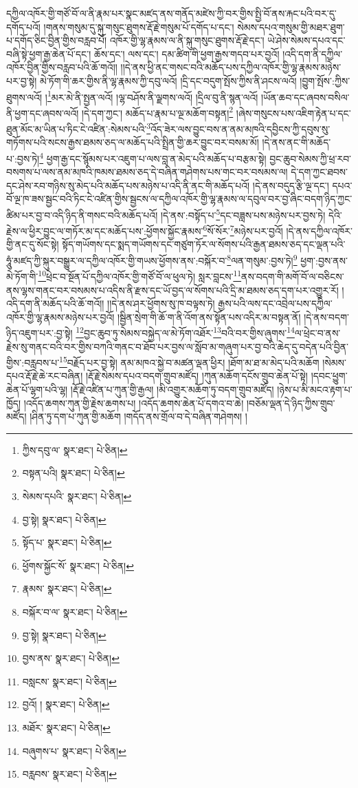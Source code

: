 དཀྱིལ་འཁོར་གྱི་གཙོ་བོ་ལ་ནི་རྣམ་པར་སྣང་མཛད་ནས་གནོད་མཛེས་ཀྱི་བར་གྱིས་སྤྱི་བོ་ནས་རྐང་པའི་བར་དུ་དགོད་པའོ། །གནས་གསུམ་དུ་སྐུ་གསུང་ཐུགས་རྡོ་རྗེ་གསུམ་པོ་དགོད་པ་དང་། སེམས་དཔའ་གསུམ་གྱི་མཐར་ཐུག་པ་དགོད་ཅིང་བྱིན་གྱིས་བརླབ་པོ། འཁོར་གྱི་ལྷ་རྣམས་ལ་ནི་སྐུ་གསུང་ཐུགས་རྡོ་རྗེ་དང་། ཡེ་ཤེས་སེམས་དཔའ་དང་བཞི་སྟེ་ཕྱག་རྒྱ་ཆེན་པོ་དང་། ཆོས་དང་། ལས་དང་། དམ་ཚིག་གི་ཕྱག་རྒྱས་གདབ་པར་བྱའོ། །འདི་དག་ནི་དཀྱིལ་འཁོར་བྱིན་གྱིས་བརླབ་པའི་ཆོ་གའོ།། །།དེ་ནས་ཕྱི་ནང་གསང་བའི་མཆོད་པས་དཀྱིལ་འཁོར་གྱི་ལྷ་རྣམས་མཉེས་པར་བྱ་སྟེ། མེ་ཏོག་གི་ཆར་གྱིས་ནི་ལྷ་རྣམས་ཀྱི་དབུ་ལའོ། །དྲི་དང་བདུག་སྤོས་ཀྱིས་ནི་ཤངས་ལའོ། །བྱུག་སྤོས་:ཀྱིས་ཐུགས་ལའོ། །\footnote{ཀྱིས་དབུ་ལ་  སྣར་ཐང་།  པེ་ཅིན། }མར་མེ་ནི་སྤྱན་ལའོ། །ལྷ་བཤོས་ནི་ལྗགས་ལའོ། །དྲིལ་བུ་ནི་སྙན་ལའོ། །ཡོན་ཆབ་དང་ཞབས་བསིལ་ནི་ཕྱག་དང་ཞབས་ལའོ། །དེ་དག་ཀྱང་། མཆོད་པ་རྣམ་པ་ལྔ་མཆོག་བསྟན།\footnote{བསྟན་པའི།  སྣར་ཐང་།  པེ་ཅིན། } །ཞེས་གསུངས་པས་འཇིག་རྟེན་པ་དང་ཐུན་མོང་མ་ཡིན་པ་ཏིང་ངེ་འཛིན་:སེམས་པའི་\footnote{སེམས་དཔའི་  སྣར་ཐང་།  པེ་ཅིན། }འོད་ཟེར་ལས་བྱུང་བས་ན་ནམ་མཁའི་དབྱིངས་ཀྱི་དབུས་སུ་གཏོགས་པའི་སངས་རྒྱས་ཐམས་ཅད་ལ་མཆོད་པའི་སྤྲིན་གྱི་ཆར་བྱུང་བར་བསམ་མོ། །དེ་ནས་ནང་གི་མཆོད་པ་:བྱས་ཏེ།\footnote{བྱ་སྟེ།  སྣར་ཐང་།  པེ་ཅིན། } ཕྱག་རྒྱ་དང་སྙོམས་པར་འཇུག་པ་ལས་བླ་ན་མེད་པའི་མཆོད་པ་བརྩམ་སྟེ། བྱང་ཆུབ་སེམས་ཀྱི་ཕྲ་རབ་བསགས་པ་ལས་ནམ་མཁའི་ཁམས་ཐམས་ཅད་དེ་བཞིན་གཤེགས་པས་གང་བར་བསམས་ལ། དེ་དག་ཀྱང་ཐབས་དང་ཤེས་རབ་གཉིས་སུ་མེད་པའི་མཆོད་པས་མཉེས་པ་འདི་ནི་ནང་གི་མཆོད་པའོ། །དེ་ནས་བདུད་རྩི་ལྔ་དང་། དཔའ་བོ་ལྔ་ཁ་ཟས་སྦྱང་བའི་ཏིང་ངེ་འཛིན་གྱིས་སྦྱངས་ལ་དཀྱིལ་འཁོར་གྱི་ལྷ་རྣམས་ལ་དབུལ་བར་བྱ་ཞིང་བདག་ཉིད་ཀྱང་ཚིམ་པར་བྱ་བ་འདི་ཉིད་ནི་གསང་བའི་མཆོད་པའོ། །དེ་ནས་:བསྟོད་པ་\footnote{སྟོད་པ་  སྣར་ཐང་།  པེ་ཅིན། }དང་བཟླས་པས་མཉེས་པར་བྱས་ཏེ། དེའི་རྗེས་ལ་ཕྱིར་བྱུང་ལ་གཏོར་མ་དང་མཆོད་པས་:ཕྱོགས་སྐྱོང་རྣམས་\footnote{ཕྱོགས་སྐྱོང་སོ་  སྣར་ཐང་།  པེ་ཅིན། }སོ་སོར་\footnote{རྣམས་  སྣར་ཐང་།  པེ་ཅིན། }མཉེས་པར་བྱའོ། །དེ་ནས་དཀྱིལ་འཁོར་གྱི་ནང་དུ་སོང་སྟེ། སྟོད་གཡོགས་དང་སྨད་གཡོགས་དང་གཙུག་ཏོར་ལ་སོགས་པའི་རྒྱན་ཐམས་ཅད་དང་ལྡན་པའི་ཧཱུཾ་མཛད་ཀྱི་སྐུར་བསྒྱུར་ལ་དཀྱིལ་འཁོར་གྱི་གཡས་ཕྱོགས་ནས་:བསྐོར་བ་\footnote{བསྐོར་བ་ལ་  སྣར་ཐང་།  པེ་ཅིན། }ལན་གསུམ་:བྱས་ཏེ།\footnote{བྱ་སྟེ།  སྣར་ཐང་།  པེ་ཅིན། } ཕྱག་:བྱས་ནས་མེ་ཏོག་གི་\footnote{བྱས་ནས་  སྣར་ཐང་།  པེ་ཅིན། }ཕྲེང་བ་སྔོན་པོ་དཀྱིལ་འཁོར་གྱི་གཙོ་བོ་ལ་ཕུལ་ཏེ། སླར་བླངས་\footnote{བསླངས་  སྣར་ཐང་།  པེ་ཅིན། }ནས་བདག་གི་མགོ་བོ་ལ་བཅིངས་ནས་ལྷས་གནང་བར་བསམས་པ་འདིས་ནི་རྫས་དང་ཡོ་བྱད་ལ་སོགས་པའི་དྲི་མ་ཐམས་ཅད་དག་པར་འགྱུར་རོ། །འདི་དག་ནི་མཆོད་པའི་ཆོ་གའོ།། །།དེ་ནས་ཤར་ཕྱོགས་སུ་ཁ་བལྟས་ཏེ། རྒྱས་པའི་ལས་དང་འབྲེལ་པས་དཀྱིལ་འཁོར་གྱི་ལྷ་རྣམས་མཉེས་པར་བྱའོ། །སྦྱིན་སྲེག་གི་ཆོ་ག་ནི་འོག་ནས་སྟོན་པས་འདིར་མ་བསྟན་ནོ། །དེ་ནས་བདག་ཉིད་འཇུག་པར་:བྱ་སྟེ། \footnote{བྱའོ། །   སྣར་ཐང་།  པེ་ཅིན། }བྱང་ཆུབ་ཏུ་སེམས་བསྐྱེད་ལ་མེ་ཏོག་འཐོར་\footnote{མཐོར་  སྣར་ཐང་།  པེ་ཅིན། }བའི་བར་གྱིས་ཞུགས་\footnote{བཞུགས་པ་  སྣར་ཐང་།  པེ་ཅིན། }ལ་ཕྲེང་བ་ནས་རྗེས་སུ་གནང་བའི་བར་གྱིས་བཀའི་གནང་བ་ཐོབ་པར་བྱས་ལ་སློབ་མ་གཞུག་པར་བྱ་བའི་ཆེད་དུ་བདེན་པའི་བྱིན་གྱིས་:བརླབས་པ་\footnote{བརླབས་  སྣར་ཐང་།  པེ་ཅིན། }བརྗོད་པར་བྱ་སྟེ། ནམ་མཁའ་སྐྱེ་བ་མཚན་ལྡན་ཕྱིར། །ཐོག་མ་ཐ་མ་མེད་པའི་མཆོག །སེམས་དཔའ་རྡོ་རྗེ་ཆེ་རང་བཞིན། །རྡོ་རྗེ་སེམས་དཔའ་བདག་གྲུབ་མཛོད། །ཀུན་མཆོག་དངོས་གྲུབ་ཆེན་པོ་སྟེ། །དབང་ཕྱུག་ཆེན་པོ་ལྷག་པའི་ལྷ། །རྡོ་རྗེ་འཛིན་པ་ཀུན་གྱི་རྒྱལ། །མི་འགྱུར་མཆོག་ཏུ་བདག་གྲུབ་མཛོད། །ཉེས་པ་མི་མངའ་རྟག་པ་ཁྱོད། །འདོད་ཆགས་ཀུན་གྱི་རྗེས་ཆགས་པ། །འདོད་ཆགས་ཆེན་པོ་དགའ་བ་ཆེ། །བཅོམ་ལྡན་དེ་ཉིད་ཀྱིས་གྲུབ་མཛོད། །ཤིན་ཏུ་དག་པ་ཀུན་གྱི་མཆོག །གདོད་ནས་གྲོལ་བ་དེ་བཞིན་གཤེགས། །
